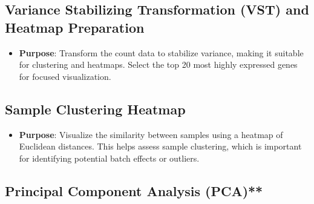 \documentclass[
  11pt,
]{article}
\providecommand{\tightlist}{%
  \setlength{\itemsep}{0pt}\setlength{\parskip}{0pt}}\usepackage{longtable,booktabs,array}
\begin{document}
\subsection{Variance Stabilizing Transformation (VST) and Heatmap
Preparation}\label{variance-stabilizing-transformation-vst-and-heatmap-preparation}

\begin{itemize}
\tightlist
\item
  \textbf{Purpose}: Transform the count data to stabilize variance,
  making it suitable for clustering and heatmaps. Select the top 20 most
  highly expressed genes for focused visualization.
\end{itemize}

\subsection{Sample Clustering Heatmap}\label{sample-clustering-heatmap}

\begin{itemize}
\tightlist
\item
  \textbf{Purpose}: Visualize the similarity between samples using a
  heatmap of Euclidean distances. This helps assess sample clustering,
  which is important for identifying potential batch effects or
  outliers.
\end{itemize}

\subsection{Principal Component Analysis
(PCA)**}\label{principal-component-analysis-pca}
\end{document}
